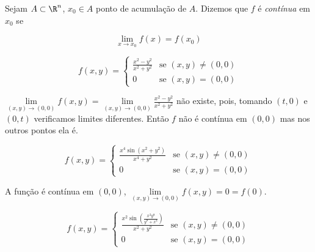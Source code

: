 \documentclass{book}
\begin{document}
\begin{defn}
    Sejam $A \subset \R^n$, $x_0 \in A$ ponto de acumula\c c\~ao de $A$. Dizemos que $f$ \'e \textit{cont\'inua} em $x_0$ se

\[\boxed{
    \mathop {\lim }\limits_{x \to x_0 } f\left( x \right) = f\left( {x_0 } \right)}
\]

\end{defn}

\begin{ex}
\begin{equation*}
f(x,y)=\left\{ \begin{array}{cl}\displaystyle
        \frac{{x^2  - y^2 }}{{x^2  + y^2 }} & \textrm{se }\left( {x,y} \right) \ne \left( {0,0} \right)\\
        0 & \textrm{se }\left( {x,y} \right) = \left( {0,0} \right)\end{array}\right.
\end{equation*}
\end{ex}

\begin{sol}
    $\displaystyle \mathop {\lim }\limits_{\left( {x,y} \right) \to \left( {0,0} \right)} f\left( {x,y} \right) = \mathop {\lim }\limits_{\left( {x,y} \right) \to \left( {0,0} \right)} \frac{{x^2  - y^2 }}{{x^2  + y^2 }}$ n\~ao existe, pois, tomando $(t,0)$ e $(0,t)$ verificamos limites diferentes. Ent\~ao $f$ n\~ao \'e cont\'inua em $(0,0)$ mas nos outros pontos ela \'e.
\end{sol}

\begin{ex}
\begin{equation*}
f(x,y)=\left\{ \begin{array}{cl}\displaystyle
\frac{{x^4 \sin \left( {x^2  + y^2 } \right)}}
        {{x^4  + y^2 }} & \textrm{se }\left( {x,y} \right) \ne \left( {0,0} \right)\\
        0 & \textrm{se }\left( {x,y} \right) = \left( {0,0} \right)\end{array}\right.
\end{equation*}

\end{ex}

\begin{sol}
    A fun\c c\~ao \'e cont\'inua em $(0,0)$, $\mathop {\lim }\limits_{\left( {x,y} \right) \to \left( {0,0} \right)} f\left( {x,y} \right) = 0 = f\left( 0 \right)$.
\end{sol}

\begin{ex}
\begin{equation*}
f(x,y)=\left\{ \begin{array}{cl}\displaystyle
\frac{{x^2 \sin \left( \displaystyle {\frac{{x^2 y^8 }}
        {{y^8  + x^4 }}} \right)}}{{x^2  + y^2 }} & \textrm{se }\left( {x,y} \right) \ne \left( {0,0} \right)\\
        0 & \textrm{se }\left( {x,y} \right) = \left( {0,0} \right)\end{array}\right.
\end{equation*}

\end{ex}
\end{document}
